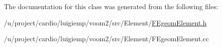 The documentation for this class was generated from the following files:\begin{DoxyCompactItemize}
\item 
/u/project/cardio/luigiemp/voom2/src/Element/\hyperlink{_f_egeom_element_8h}{FEgeomElement.h}\item 
/u/project/cardio/luigiemp/voom2/src/Element/FEgeomElement.cc\end{DoxyCompactItemize}

